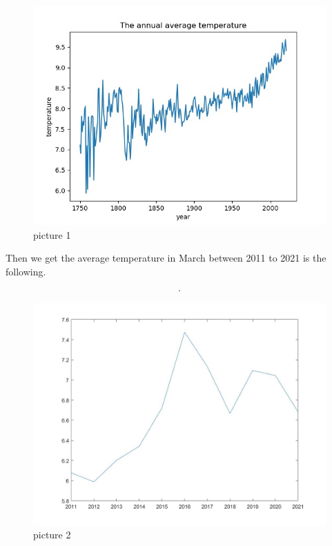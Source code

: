 \documentclass{apmcmthesis}
\begin{document}
\begin{figure}[htbp]
  \centering
  \includegraphics[scale=0.4]{annual avg tem.jpg}
  \caption{picture 1}
\end{figure}

Then we get the average temperature in March between 2011 to 2021 is the following. 

\begin{align*}
  [6.0780,5.9890, 6.2030, 6.3420 , 6.7220 ,7.4750 , 7.1340 , 6.6680 , 7.0950  ,7.0450 ,6.6840].
\end{align*}

\begin{figure}[htbp]
  \centering
  \includegraphics[scale=0.2]{past 10 avg.jpg}
  \caption{picture 2}
\end{figure}
\end{document}
